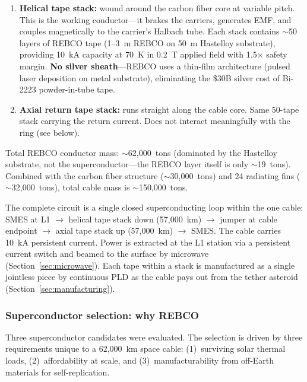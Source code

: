 \documentclass[12pt,letterpaper]{article}
\begin{document}
\begin{enumerate}[label=(\roman*)]
\item \textbf{Helical tape stack:} wound around the carbon fiber core at variable pitch. This is the working conductor---it brakes the carriers, generates EMF, and couples magnetically to the carrier's Halbach tube. Each stack contains ${\sim}$50 layers of REBCO tape (1--3~\textmu m REBCO on 50~\textmu m Hastelloy substrate), providing 10~kA capacity at 70~K in 0.2~T applied field with 1.5$\times$ safety margin. \textbf{No silver sheath}---REBCO uses a thin-film architecture (pulsed laser deposition on metal substrate), eliminating the \$30B silver cost of Bi-2223 powder-in-tube tape.

\item \textbf{Axial return tape stack:} runs straight along the cable core. Same 50-tape stack carrying the return current. Does not interact meaningfully with the ring (see below).
\end{enumerate}

Total REBCO conductor mass: ${\sim}$62{,}000~tons (dominated by the Hastelloy substrate, not the superconductor---the REBCO layer itself is only ${\sim}$19~tons). Combined with the carbon fiber structure (${\sim}$30{,}000~tons) and 24 radiating fins (${\sim}$32{,}000~tons), total cable mass is ${\sim}$150{,}000~tons.

The complete circuit is a single closed superconducting loop within the one cable: SMES at L1 $\to$ helical tape stack down (57{,}000~km) $\to$ jumper at cable endpoint $\to$ axial tape stack up (57{,}000~km) $\to$ SMES\@. The cable carries 10~kA persistent current. Power is extracted at the L1 station via a persistent current switch and beamed to the surface by microwave (Section~\ref{sec:microwave}). Each tape within a stack is manufactured as a single jointless piece by continuous PLD as the cable pays out from the tether asteroid (Section~\ref{sec:manufacturing}).

\subsubsection{Superconductor selection: why REBCO}\label{sec:sc_selection}

Three superconductor candidates were evaluated. The selection is driven by three requirements unique to a 62{,}000~km space cable: (1)~surviving solar thermal loads, (2)~affordability at scale, and (3)~manufacturability from off-Earth materials for self-replication.
\end{document}
